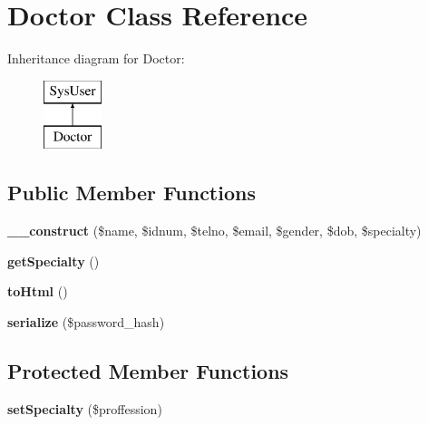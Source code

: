 \hypertarget{classDoctor}{\section{Doctor Class Reference}
\label{classDoctor}
}
Inheritance diagram for Doctor\-:\begin{figure}[H]
\begin{center}
\leavevmode
\includegraphics[height=2.000000cm]{classDoctor}
\end{center}
\end{figure}
\subsection*{Public Member Functions}
\begin{DoxyCompactItemize}
\item 
\hypertarget{classDoctor_aed7bdefef0924c0f2967035d09650781}{{\bfseries \-\_\-\-\_\-construct} (\$name, \$idnum, \$telno, \$email, \$gender, \$dob, \$specialty)}\label{classDoctor_aed7bdefef0924c0f2967035d09650781}

\item 
\hypertarget{classDoctor_a78c8341807f81afa4fe557c7fad91ca3}{{\bfseries get\-Specialty} ()}\label{classDoctor_a78c8341807f81afa4fe557c7fad91ca3}

\item 
\hypertarget{classDoctor_aac133c6401691cfa18324e53af9d97de}{{\bfseries to\-Html} ()}\label{classDoctor_aac133c6401691cfa18324e53af9d97de}

\item 
\hypertarget{classDoctor_a87012890b2b6c0d355b6251769f33171}{{\bfseries serialize} (\$password\-\_\-hash)}\label{classDoctor_a87012890b2b6c0d355b6251769f33171}

\end{DoxyCompactItemize}
\subsection*{Protected Member Functions}
\begin{DoxyCompactItemize}
\item 
\hypertarget{classDoctor_ad2a680b4c7541a4205af2539af736b65}{{\bfseries set\-Specialty} (\$proffession)}\label{classDoctor_ad2a680b4c7541a4205af2539af736b65}

\end{DoxyCompactItemize}
